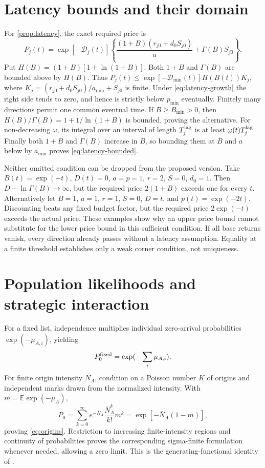 \documentclass[11pt,a4paper]{article}
\theoremstyle{definition}\newtheorem{definition}{Definition}
\begin{document}
\section{Latency bounds and their domain}
\label{app:latency-proof}
For \cref{prop:latency}, the exact required price is
\[
 P_j(t)=\exp[-\mathcal D_j(t)]\left\{
 \frac{(1+B)(r_{j0}+d_0S_{j0})}{a}+\Gamma(B)S_{j0}\right\}.
\]
Put $H(B)=(1+B)[1+\ln(1+B)]$. Both $1+B$ and $\Gamma(B)$ are bounded
above by $H(B)$. Thus
$P_j(t)\leq\exp[-\mathcal D_{\min}(t)]H(B(t))K_j$, where
$K_j=(r_{j0}+d_0S_{j0})/a_{\min}+S_{j0}$ is finite. Under
\cref{eq:latency-growth} the right side tends to zero, and hence is
strictly below $p_{\min}$ eventually. Finitely many directions permit
one common eventual time. If $B\geq B_{\min}>0$, then
$H(B)/\Gamma(B)=1+1/\ln(1+B)$ is bounded, proving the alternative.
For non-decreasing $\omega$, its integral over an interval of length
$T_j^{\rm lag}$ is at least $\omega(t)T_j^{\rm lag}$. Finally both
$1+B$ and $\Gamma(B)$ increase in $B$, so bounding them at $\bar B$
and $a$ below by $a_{\min}$ proves \cref{eq:latency-bounded}.

Neither omitted condition can be dropped from the proposed version.
Take $B(t)=\exp(-t)$, $D(t)=0$, $a=p=1$, $r=2$, $S=0$, $d_0=1$.
Then $D-\ln\Gamma(B)\to\infty$, but the required price
$2(1+B)$ exceeds one for every $t$. Alternatively let $B=1$, $a=1$,
$r=1$, $S=0$, $D=t$, and $p(t)=\exp(-2t)$. Discounting beats any
fixed budget factor, but the required price $2\exp(-t)$ exceeds the
actual price. These examples show why an upper price bound cannot
substitute for the lower price bound in this sufficient condition.
If all base returns vanish, every direction already passes without a
latency assumption. Equality at a finite threshold establishes only a
weak corner condition, not uniqueness.

\section{Population likelihoods and strategic interaction}
\label{app:population-proof}
For a fixed list, independence multiplies individual zero-arrival
probabilities $\exp(-\mu_{A,i})$, yielding
\begin{equation}
 P_0^{\rm fixed}=\exp(-\sum_i\mu_{A,i}).\label{eq:fixed}
\end{equation}
For finite origin intensity $\bar N_A$, condition on a Poisson number
$K$ of origins and independent marks drawn from the normalized intensity.
With $m=\mathbb E\exp(-\mu_A)$,
\[
 P_0=\sum_{k=0}^\infty e^{-\bar N_A}
 \frac{\bar N_A^k}{k!}m^k
 =\exp[-\bar N_A(1-m)],
\]
proving \cref{eq:origins}. Restriction to increasing finite-intensity
regions and continuity of probabilities proves the corresponding
sigma-finite formulation whenever needed, allowing a zero limit. This
is the generating-functional identity of \citet{LastPenrose2017}.
\end{document}

